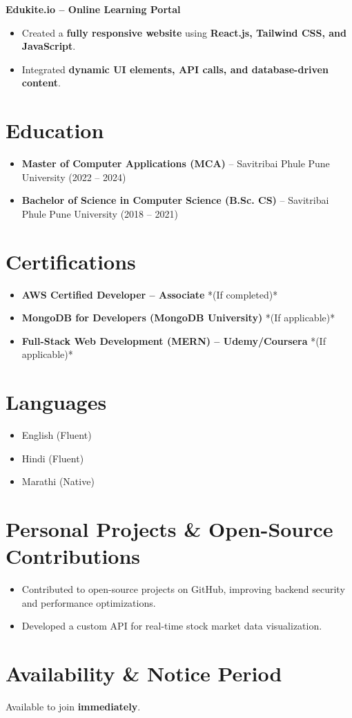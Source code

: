 \documentclass[a4paper,10pt]{article}
\begin{document}
\textbf{Edukite.io – Online Learning Portal}
\begin{itemize}
    \item Created a \textbf{fully responsive website} using \textbf{React.js, Tailwind CSS, and JavaScript}.
    \item Integrated \textbf{dynamic UI elements, API calls, and database-driven content}.
\end{itemize}

\section*{Education}
\begin{itemize}
    \item \textbf{Master of Computer Applications (MCA)} – Savitribai Phule Pune University (2022 – 2024)
    \item \textbf{Bachelor of Science in Computer Science (B.Sc. CS)} – Savitribai Phule Pune University (2018 – 2021)
\end{itemize}

\section*{Certifications}
\begin{itemize}
    \item \textbf{AWS Certified Developer – Associate} *(If completed)*
    \item \textbf{MongoDB for Developers (MongoDB University)} *(If applicable)*
    \item \textbf{Full-Stack Web Development (MERN) – Udemy/Coursera} *(If applicable)*
\end{itemize}

\section*{Languages}
\begin{itemize}
    \item English (Fluent)
    \item Hindi (Fluent)
    \item Marathi (Native)
\end{itemize}

\section*{Personal Projects \& Open-Source Contributions}
\begin{itemize}
    \item Contributed to open-source projects on GitHub, improving backend security and performance optimizations.
    \item Developed a custom API for real-time stock market data visualization.
\end{itemize}

\section*{Availability \& Notice Period}
Available to join \textbf{immediately}.
\end{document}
